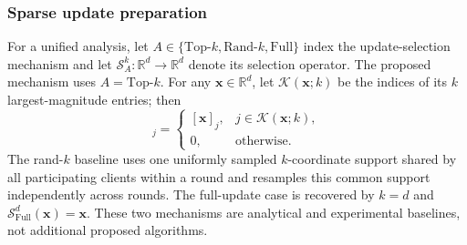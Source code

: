 \documentclass[journal]{IEEEtran}
\begin{document}
\subsubsection{Sparse update preparation}
For a unified analysis, let $A\in\{\mathrm{Top}\text{-}k,\mathrm{Rand}\text{-}k,\mathrm{Full}\}$ index the update-selection mechanism and let $\mathcal{S}_A^k:\mathbb{R}^d\to\mathbb{R}^d$ denote its selection operator. The proposed mechanism uses $A=\mathrm{Top}\text{-}k$. For any $\mathbf{x}\in\mathbb{R}^d$, let $\mathcal{K}(\mathbf{x};k)$ be the indices of its $k$ largest-magnitude entries; then
{
\begin{equation}
	[\mathcal{S}_{\mathrm{Top}}^k(\mathbf{x})]_j
	=\begin{cases}
		[\mathbf{x}]_j,&j\in\mathcal{K}(\mathbf{x};k),\\
		0,&\text{otherwise}.
	\end{cases}
	\label{eqn:topk_operator}
\end{equation}
}
The rand-$k$ baseline uses one uniformly sampled $k$-coordinate support shared by all participating clients within a round and resamples this common support independently across rounds. The full-update case is recovered by $k=d$ and $\mathcal{S}_{\mathrm{Full}}^d(\mathbf{x})=\mathbf{x}$. These two mechanisms are analytical and experimental baselines, not additional proposed algorithms.
\end{document}
